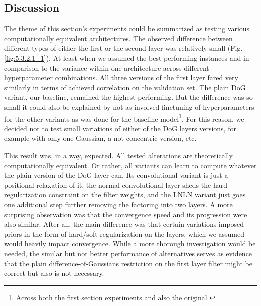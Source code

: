 \subsection{Discussion}

The theme of this section’s experiments could be summarized as testing various computationally equivalent architectures. The observed difference between different types of either the first or the second layer was relatively small (Fig. \ref{fig:5.3.2.1_1}). At least when we assumed the best performing instances and in comparison to the variance within one architecture across different hyperparameter combinations. All three versions of the first layer fared very similarly in terms of achieved correlation on the validation set. The plain DoG variant, our baseline, remained the highest performing. But the difference was so small it could also be explained by not as involved finetuning of hyperparameters for the other variants as was done for the baseline model\footnote{Across both the first section experiments and also the original \cite{antolik}}. For this reason, we decided not to test small variations of either of the DoG layers versions, for example with only one Gaussian, a not-concentric version, etc. 

This result was, in a way, expected. All tested alterations are theoretically computationally equivalent. Or rather, all variants can learn to compute whatever the plain version of the DoG layer can. Its convolutional variant is just a positional relaxation of it, the normal convolutional layer sheds the hard regularization constraint on the filter weights, and the LNLN variant just goes one additional step further removing the factoring into two layers. A more surprising observation was that the convergence speed and its progression were also similar. After all, the main difference was that certain variations imposed priors in the form of hard/soft regularization on the layers, which we assumed would heavily impact convergence. While a more thorough investigation would be needed, the similar but not better performance of alternatives serves as evidence that the plain difference-of-Gaussians restriction on the first layer filter might be correct but also is not necessary.

